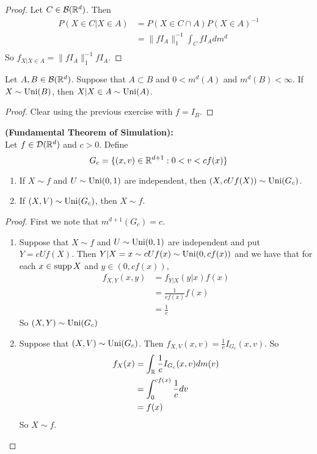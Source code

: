 \documentclass{book}
\begin{document}
	\begin{proof}
		Let $C \in \mathcal{B}(\mathbb{R}^d)$. Then
		\begin{align*}
			P(X \in C|X \in A)
			&= P(X \in C \cap A) P(X \in A)^{-1} \\
			&= \|fI_A\|_1^{-1} \int_C fI_A dm^d \\
		\end{align*}
		So $f_{X|X \in A} = \|fI_A\|_1^{-1}fI_A$.
	\end{proof}
	
	\begin{ex}
		Let $A, B \in \mathcal{B}(\mathbb{R}^d)$. Suppose that $A \subset B$ and $0 < m^d(A)$ and $ m^{d}(B) < \infty$. If $X \sim \operatorname{Uni}(B)$, then $X|X \in A \sim \operatorname{Uni}(A)$. 
	\end{ex}

	\begin{proof}
		Clear using the previous exercise with $f = I_B$.
	\end{proof}
	
	\begin{ex}\textbf{(Fundamental Theorem of Simulation):} \\
		Let $f \in \mathcal{D}(\mathbb{R}^d)$ and $c > 0$. Define $$G_c = \{(x,v) \in \mathbb{R}^{d+1}: 0< v < cf(x)\}$$ 
		\begin{enumerate}
			\item If $X \sim f$ and $U \sim \operatorname{Uni}(0,1)$  are independent, then $(X, cUf(X)) \sim \operatorname{Uni}(G_c)$.
			\item If $(X, V) \sim \operatorname{Uni}(G_c)$, then $X \sim f$.
		\end{enumerate}
	\end{ex}

	\begin{proof} First we note that $m^{d+1}(G_c) = c$. 
		\begin{enumerate}
			\item Suppose that $X \sim f$ and $U \sim \operatorname{Uni}(0,1)$ are independent and put $Y = cUf(X)$. Then $Y| X= x \sim cUf(x) \sim \operatorname{Uni}(0, cf(x))$ and we have that for each $x \in \operatorname{supp} X$ and $y \in (0, cf(x))$,
			\begin{align*}
				f_{X, Y}(x,y) 
				&= f_{Y|X}(y| x) f(x) \\
				&= \frac{1}{c f(x)}f(x) \\
				&= \frac{1}{c}
			\end{align*}
			So $(X, Y) \sim \operatorname{Uni}(G_c)$\\
			\item Suppose that $(X, V) \sim \operatorname{Uni}(G_c)$. Then $f_{X,V}(x,v) = \frac{1}{c} I_{G_c}(x,v)$. So 
			\begin{align*}
				f_X(x) 
				&= \int_{\mathbb{R}} \frac{1}{c}I_{G_c}(x,v) dm(v) \\ 
				&= \int_{0}^{cf(x)} \frac{1}{c}dv \\
				&= f(x) 
			\end{align*}
			So $X \sim f$.
		\end{enumerate}
	\end{proof}
\end{document}
